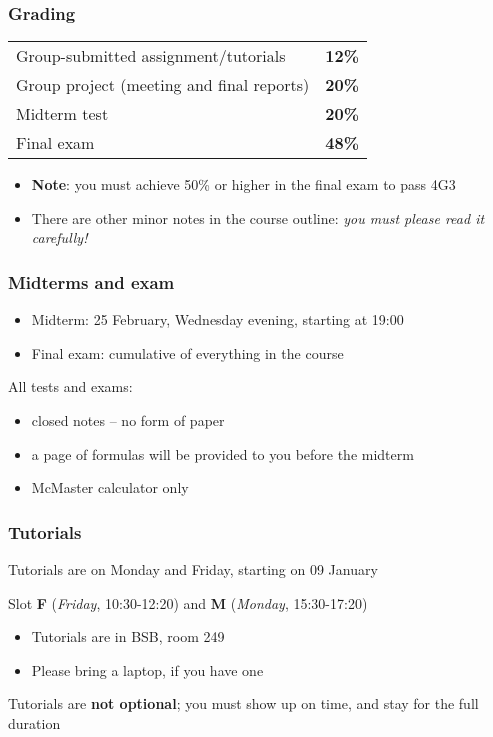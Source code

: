 \begin{frame}\frametitle{Grading}
	\begin{tabular}{lc}
		Group-submitted assignment/tutorials 					& \textbf{12\%} \\
		Group project (meeting and final reports)				& \textbf{20\%} \\
		Midterm test											& \textbf{20\%} \\
		Final exam												& \textbf{48\%} \\
	\end{tabular}

	\vspace{24pt}
	\begin{itemize}
		\item	\textbf{Note}: you must achieve 50\% or higher in the final exam to pass 4G3
		\item	There are other minor notes in the course outline: \emph{{\color{myOrange}you must please read it carefully!}}
	\end{itemize}
\end{frame}

\begin{frame}\frametitle{Midterms and exam}

	\begin{itemize}
		\item	Midterm: 25 February, Wednesday evening, starting at 19:00
		
		\vspace{12pt}
		\item	Final exam: cumulative of everything in the course
	\end{itemize}

	\vspace{24pt}
	All tests and exams:
	\begin{itemize}
		\item	closed notes -- no form of paper
		\item	a page of formulas will be provided to you before the midterm
		\item	McMaster calculator only
	\end{itemize}
\end{frame}

\begin{frame}\frametitle{Tutorials}
	Tutorials are on Monday and Friday, starting on 09 January
	
	\vspace{12pt}
	Slot \textbf{F} (\emph{Friday}, 10:30-12:20) and \textbf{M} (\emph{Monday}, 15:30-17:20) 

	\begin{itemize}
		\item	Tutorials are in BSB, room 249
		\item	Please bring a laptop, if you have one
	\end{itemize}
	
	\pause
	\begin{exampleblock}{}
		\centering
		{\color{red}Tutorials are \textbf{not optional};} you must show up on time, and stay for the full duration
	\end{exampleblock}
\end{frame}

